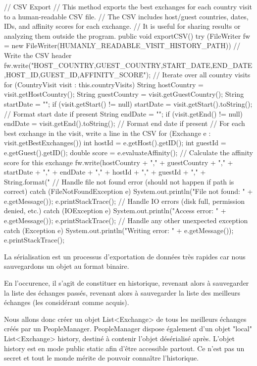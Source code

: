 \documentclass{mytex}
\begin{document}
\begin{codebox}
// CSV Export
// This method exports the best exchanges for each country visit to a human-readable CSV file.
// The CSV includes host/guest countries, dates, IDs, and affinity scores for each exchange.
// It is useful for sharing results or analyzing them outside the program.
public void exportCSV() {
	try (FileWriter fw = new FileWriter(HUMANLY_READABLE_VISIT_HISTORY_PATH)) {
		// Write the CSV header
		fw.write("HOST_COUNTRY,GUEST_COUNTRY,START_DATE,END_DATE,HOST_ID,GUEST_ID,AFFINITY_SCORE\r\n");
		// Iterate over all country visits
		for (CountryVisit visit : this.countryVisits) {
			String hostCountry = visit.getHostCountry();
			String guestCountry = visit.getGuestCountry();
			String startDate = "";
			if (visit.getStart() != null) startDate = visit.getStart().toString(); // Format start date if present
			String endDate = "";
			if (visit.getEnd() != null) endDate = visit.getEnd().toString(); // Format end date if present
			// For each best exchange in the visit, write a line in the CSV
			for (Exchange e : visit.getBestExchanges()) {
				int hostId = e.getHost().getID();
				int guestId = e.getGuest().getID();
				double score = e.evaluateAffinity(); // Calculate the affinity score for this exchange
				fw.write(hostCountry + "," + guestCountry + "," + startDate + "," + endDate + "," +
				hostId + "," + guestId + "," + String.format("%
			}
		}
	} 
	// Handle file not found error (should not happen if path is correct)
	catch (FileNotFoundException e) {
		System.out.println("File not found: " + e.getMessage());
		e.printStackTrace();
	}
	// Handle IO errors (disk full, permission denied, etc.)
	catch (IOException e) {
		System.out.println("Access error: " + e.getMessage());
		e.printStackTrace();
	}
	// Handle any other unexpected exception
	catch (Exception e) {
		System.out.println("Writing error: " + e.getMessage());
		e.printStackTrace();
	}
}
\end{codebox}


La sérialisation est un processus d'exportation de données très rapides car nous sauvegardons un objet au format binaire.

En l'occurence, il s'agit de constituer en historique, revenant alors à sauvegarder la liste des échanges passés, revenant alors à sauvegarder la liste des meilleurs échanges (les considérant comme acquis).

Nous allons donc créer un objet List<Exchange> de tous les meilleurs échanges créés par un PeopleManager.
PeopleManager dispose également d'un objet "local" List<Exchange> history, destiné à contenir l'objet désérialisé après. L'objet history est en mode public static afin d'être accessible partout. Ce n'est pas un secret et tout le monde mérite de pouvoir connaître l'historique.
\end{document}
